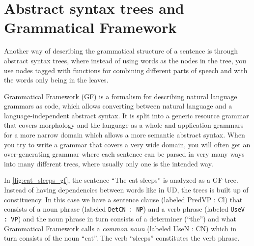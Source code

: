 





\section{Abstract syntax trees and Grammatical Framework}

Another way of describing the grammatical structure of a sentence is through abstract syntax trees, where instead of using words as the nodes in the tree, you use nodes tagged with functions for combining different parts of speech and with the words only being in the leaves.  


Grammatical Framework\cite{ranta-2004} (GF) is a formalism for describing natural language grammars as code, which allows converting between natural language and a language-independent abstract syntax. It is split into a generic resource grammar that covers morphology and the language as a whole and application grammars for a more narrow domain which allows a more semantic abstract syntax. When you try to write a grammar that covers a very wide domain, you will often get an over-generating grammar where each sentence can be parsed in very many ways into many different trees, where usually only one is the intended way.

In \autoref{fig:cat_sleeps_gf}, the sentence ``The cat sleeps'' is analyzed as a GF tree. Instead of having dependencies between words like in UD, the trees is built up of constituency. In this case we have a sentence clause (labeled PredVP : Cl) that consists of a noun phrase (labeled \verb|DetCN : NP|) and a verb phrase (labeled \verb|UseV : VP|) and the noun phrase in turn consists of a determiner (``the'') and what Grammatical Framework calls a \emph{common noun} (labeled UseN : CN) which in turn consists of the noun ``cat''. The verb ``sleeps'' constitutes the verb phrase.

